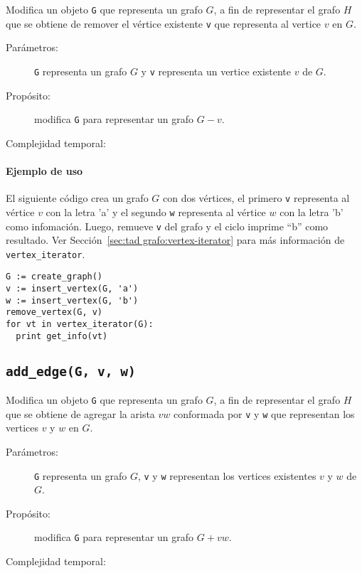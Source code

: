 \documentclass[a4paper,12pt]{article}
\begin{document}
Modifica un objeto \texttt{G} que representa un grafo $G$, a fin de representar el grafo $H$ que se obtiene de remover el vértice existente \texttt{v} que representa al vertice $v$ en $G$.
  
\begin{description}
  \item [Parámetros:] \texttt{G} representa un grafo $G$ y \texttt{v} representa un vertice existente $v$ de $G$.
  \item [Propósito:] modifica \texttt{G} para representar un grafo $G - v$.
  \item [Complejidad temporal:]
\end{description}

\paragraph{Ejemplo de uso}

El siguiente código crea un grafo $G$ con dos vértices, el primero \texttt{v} representa al vértice $v$ con la letra 'a' y el segundo \texttt{w} representa al vértice $w$ con la letra 'b' como infomación. Luego, remueve \texttt{v} del grafo y el ciclo imprime ``b'' como resultado. Ver Sección~\ref{sec:tad grafo:vertex-iterator} para más información de \texttt{vertex\_iterator}.

\begin{lstlisting}
G := create_graph()
v := insert_vertex(G, 'a')
w := insert_vertex(G, 'b')
remove_vertex(G, v)
for vt in vertex_iterator(G):
  print get_info(vt)
\end{lstlisting}


\subsection{\texttt{add\_edge(G, v, w)}}
\label{sec:tad grafo:add-edge}

Modifica un objeto \texttt{G} que representa un grafo $G$, a fin de representar el grafo $H$ que se obtiene de agregar la arista $vw$ conformada por \texttt{v} y \texttt{w} que representan los vertices $v$ y $w$ en $G$.

\begin{description}
  \item [Parámetros:] \texttt{G} representa un grafo $G$, \texttt{v} y \texttt{w} representan los vertices existentes $v$ y $w$ de $G$.
  \item [Propósito:] modifica \texttt{G} para representar un grafo $G + vw$.
  \item [Complejidad temporal:]
\end{description}
\end{document}
